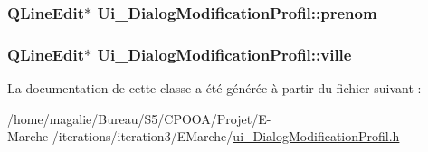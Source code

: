 \hypertarget{class_ui___dialog_modification_profil_a34af0438ab4d51c5a1cbd3171ca56fbf}{
\subsubsection[{prenom}]{\setlength{\rightskip}{0pt plus 5cm}Q\-Line\-Edit$\ast$ Ui\-\_\-\-Dialog\-Modification\-Profil\-::prenom}}\label{class_ui___dialog_modification_profil_a34af0438ab4d51c5a1cbd3171ca56fbf}
\hypertarget{class_ui___dialog_modification_profil_a1c6d48ece9604745e80462ef426ac0ea}{
\subsubsection[{ville}]{\setlength{\rightskip}{0pt plus 5cm}Q\-Line\-Edit$\ast$ Ui\-\_\-\-Dialog\-Modification\-Profil\-::ville}}\label{class_ui___dialog_modification_profil_a1c6d48ece9604745e80462ef426ac0ea}


La documentation de cette classe a été générée à partir du fichier suivant \-:\begin{DoxyCompactItemize}
\item 
/home/magalie/\-Bureau/\-S5/\-C\-P\-O\-O\-A/\-Projet/\-E-\/\-Marche-\//iterations/iteration3/\-E\-Marche/\hyperlink{ui___dialog_modification_profil_8h}{ui\-\_\-\-Dialog\-Modification\-Profil.\-h}\end{DoxyCompactItemize}

